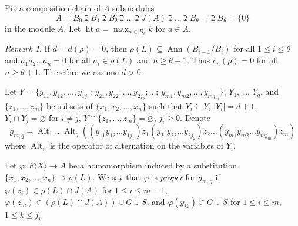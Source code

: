 \documentclass[12pt, reqno, a4paper]{amsart}
\theoremstyle{plain}
\theoremstyle{remark}
\newtheorem*{remark}{Remark}
\theoremstyle{definition}
\begin{document}
Fix a composition chain of $A$-submodules
$$A=B_0 \supsetneqq B_1 \supsetneqq B_2 \supsetneqq \ldots \supsetneqq
J(A)\supsetneqq \ldots \supsetneqq B_{\theta-1}
 \supsetneqq B_\theta = \{0\}$$
 in the module $A$. Let $\operatorname{ht} a = \max_{a \in B_k} k$ for $a \in A$.

\begin{remark}
If $d=d(\rho)=0$, then $\rho(L) \subseteq \operatorname{Ann}(B_{i-1}/B_i)$
for all $1 \leqslant i \leqslant \theta$ and
 $a_1 a_2 \ldots a_n =0$ for all $a_i \in \rho(L)$
 and $n \geqslant \theta +1$. Thus $c_n(\rho)=0$
 for all $n \geqslant \theta +1$. Therefore we assume $d > 0$.
\end{remark}

 Let $Y=\lbrace y_{11}, y_{12}, \ldots, y_{1j_1};\,
 y_{21}, y_{22}, \ldots, y_{2j_2}; \ldots;\,
 y_{m1}, y_{m2}, \ldots, y_{mj_m}\rbrace$,
 $Y_1$, \ldots, $Y_q$, and $\lbrace z_1, \ldots, z_m\rbrace$
 be subsets of $\lbrace x_1, x_2, \ldots, x_n\rbrace$
 such that $Y_i \subseteq Y$, $|Y_i|=d+1$, $ Y_i \cap Y_j = \varnothing$
 for $i \ne j$,
 $Y \cap \lbrace z_1, \ldots, z_m\rbrace = \varnothing$, $j_i \geqslant 0$.
 Denote $$g_{m,q}=\operatorname{Alt}_{1} \ldots \operatorname{Alt}_{q} ((y_{11}y_{12} \ldots y_{1j_1}) z_1
 (y_{21}y_{22}\ldots y_{2j_2}) z_2 \ldots (y_{m1}y_{m2} \ldots y_{mj_m}) z_m)$$
 where $\operatorname{Alt}_i$ is the operator of alternation on the variables of $Y_i$.

Let $\varphi \colon F\langle X \rangle \to A$
be a homomorphism induced by a substitution $\lbrace x_1, x_2, \ldots, x_n \rbrace \to \rho(L)$.
We say that $\varphi$ is \textit{proper} for  $g_{m,q}$ if
 $\varphi(z_i) \in \rho(L) \cap J(A)$ for $1\leqslant i \leqslant m-1$,
  $\varphi(z_m) \in (\rho(L) \cap J(A)) \cup G \cup S$, and
  $\varphi(y_{ik})\in G \cup S$ for $1\leqslant i \leqslant m$, $1 \leqslant k \leqslant j_i$.
\end{document}
